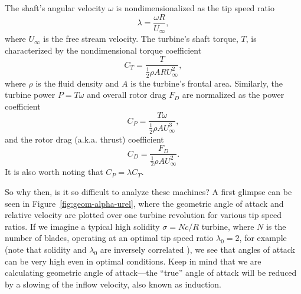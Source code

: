 The shaft's angular velocity $\omega$ is nondimensionalized as the tip speed
ratio
\begin{equation}
    \lambda = \frac{\omega R}{U_\infty},
    \label{eq:lambda}
\end{equation}
where $U_\infty$ is the free stream velocity. The turbine's shaft torque, $T$,
is characterized by the nondimensional torque coefficient
\begin{equation}
    C_T = \frac{T}{\frac{1}{2} \rho A R U_\infty^2},
    \label{eq:ct}
\end{equation}
where $\rho$ is the fluid density and $A$ is the turbine's frontal area.
Similarly, the turbine power $P = T\omega$ and overall rotor drag $F_D$ are
normalized as the power coefficient
\begin{equation}
    C_P = \frac{T \omega}{\frac{1}{2} \rho A U_\infty^3},
    \label{eq:cp}
\end{equation}
and the rotor drag (a.k.a. thrust) coefficient
\begin{equation}
    C_D = \frac{F_D}{\frac{1}{2} \rho A U_\infty^2}.
    \label{eq:cd}
\end{equation}
It is also worth noting that $C_P = \lambda C_T$.

So why then, is it so difficult to analyze these machines? A first glimpse can
be seen in Figure~\ref{fig:geom-alpha-urel}, where the geometric angle of attack
and relative velocity are plotted over one turbine revolution for various tip
speed ratios. If we imagine a typical high solidity $\sigma = Nc/R$ turbine,
where $N$ is the number of blades, operating at an optimal tip speed ratio
$\lambda_0 = 2$, for example \cite{Howell2010} (note that solidity and
$\lambda_0$ are inversely correlated \cite{Templin1974}), we see that angles of
attack can be very high even in optimal conditions. Keep in mind that we are
calculating geometric angle of attack---the ``true'' angle of attack will be
reduced by a slowing of the inflow velocity, also known as induction.

